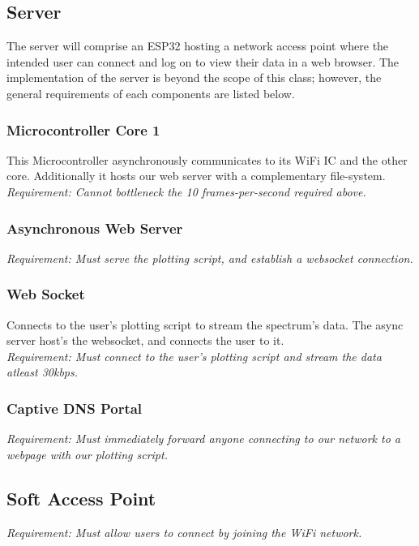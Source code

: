 \documentclass{article}
\begin{document}
    
    \subsection{Server}
        The server will comprise an ESP32 hosting a network access point where the intended user can connect and log on to view their data in a web browser. The implementation of the server is beyond the scope of this class; however, the general requirements of each components are listed below.
        \subsubsection{Microcontroller Core 1}
            This Microcontroller asynchronously communicates to its WiFi IC and the other core. Additionally it hosts our web server with a complementary file-system.    
            \textit{\\Requirement: Cannot bottleneck the 10 frames-per-second required above.}

        \subsubsection{Asynchronous Web Server}
            \textit{Requirement: Must serve the plotting script, and establish a websocket connection.}
            
        \subsubsection{Web Socket}
            Connects to the user's plotting script to stream the spectrum's data. The async server host's the websocket, and connects the user to it.
            \textit{\\Requirement: Must connect to the user's plotting script and stream the data atleast 30kbps.}
            
        \subsubsection{Captive DNS Portal}
            \textit{Requirement: Must immediately forward anyone connecting to our network to a webpage with our plotting script.}
            
        \subsection{Soft Access Point}  
            \textit{Requirement: Must allow users to connect by joining the WiFi network.}
            
\end{document}

